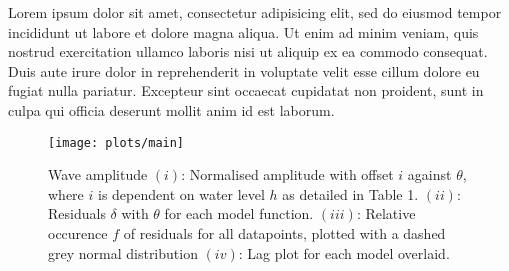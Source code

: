 \documentclass[10pt, twocolumn]{revtex4}    %
\begin{document}
Lorem ipsum dolor sit amet, consectetur adipisicing elit, sed do eiusmod tempor incididunt ut labore et dolore magna aliqua. Ut enim ad minim veniam, quis nostrud exercitation ullamco laboris nisi ut aliquip ex ea commodo consequat. Duis aute irure dolor in reprehenderit in voluptate velit esse cillum dolore eu fugiat nulla pariatur. Excepteur sint occaecat cupidatat non proident, sunt in culpa qui officia deserunt mollit anim id est laborum.

\begin{figure}[!h]
  \texttt{[image: plots/main]}
  \caption{Wave amplitude
  $(i)$: Normalised amplitude with offset $i$ against $\theta$, where $i$ is dependent on water level $h$ as detailed in Table 1.
  $(ii)$: Residuals $\delta$ with $\theta$ for each model function.
  $(iii)$: Relative occurence $f$ of residuals for all datapoints, plotted with a dashed grey normal distribution
  $(iv)$: Lag plot for each model overlaid.}
  \label{plot}
\end{figure}
\end{document}
